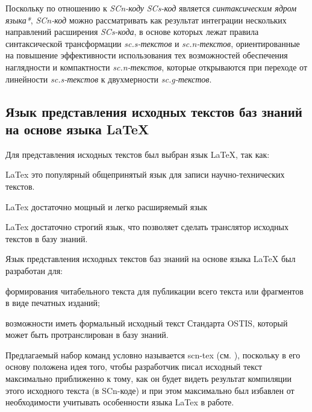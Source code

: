 Поскольку по отношению к \textit{SCn-коду} \textit{SCs-код} является \textit{синтаксическим ядром языка*}, \textit{SCn-код} можно рассматривать как результат интеграции нескольких направлений расширения \textit{SCs-кода}, в основе которых лежат правила синтаксической трансформации \textit{sc.s-текстов} и \textit{sc.n-текстов}, ориентированные на повышение эффективности использования тех возможностей обеспечения наглядности и компактности \textit{sc.n-текстов}, которые открываются при переходе от линейности \textit{sc.s-текстов} к двухмерности \textit{sc.g-текстов}.

\subsection{Язык представления исходных текстов баз знаний на основе языка LaTeX}
\label{sec_scn_latex}

Для представления исходных текстов был выбран язык LaTeX, так как:
\begin{textitemize}
	\item LaTex это популярный общепринятый язык для записи научно-технических текстов.
	\item LaTex достаточно мощный и легко расширяемый язык
	\item LaTex достаточно строгий язык, что позволяет сделать транслятор исходных текстов в базу знаний.
\end{textitemize}

Язык представления исходных текстов баз знаний на основе языка LaTeX был разработан для:
\begin{textitemize}
	\item формирования читабельного текста для публикации всего текста или фрагментов в виде печатных изданий;
	\item возможности иметь формальный исходный текст Стандарта OSTIS, который может быть протранслирован в базу знаний.
\end{textitemize}

Предлагаемый набор команд условно называется scn-tex (см. ), поскольку в его основу положена идея того, чтобы разработчик писал исходный текст максимально приближенно к тому, как он будет видеть результат компиляции этого исходного текста (в SCn-коде) и при этом максимально был избавлен от необходимости учитывать особенности языка LaTex в работе.

